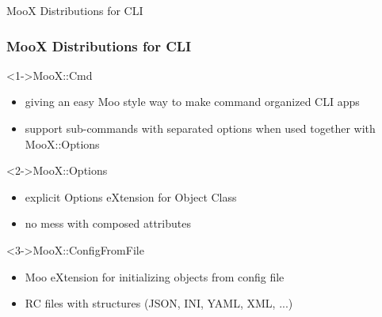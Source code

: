 \documentclass[ngerman,xcolor={table,dvipsnames},scriptsizeer,compress,hyperref={bookmarks,colorlinks}]{beamer}
\begin{document}
\begin{frame}[t,fragile]{MooX Distributions for CLI}
\frametitle{MooX Distributions for CLI}

\begin{block}<1->{MooX::Cmd}
\begin{itemize}
\item giving an easy Moo style way to make command organized CLI apps
\item support sub-commands with separated options when used together with MooX::Options
\end{itemize}
\end{block}

\begin{block}<2->{MooX::Options}
\begin{itemize}
\item explicit Options eXtension for Object Class
\item no mess with composed attributes
\end{itemize}
\end{block}

\begin{block}<3->{MooX::ConfigFromFile}
\begin{itemize}
\item Moo eXtension for initializing objects from config file
\item RC files with structures (JSON, INI, YAML, XML, ...)
\end{itemize}
\end{block}

\end{frame}
\end{document}
